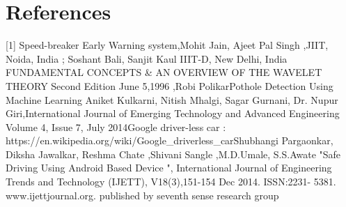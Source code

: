 \documentclass[12pt,twocolumn]{article}
\begin{document}
\section{References}
[1]	Speed-breaker Early Warning system,Mohit Jain, Ajeet Pal Singh ,JIIT, Noida, India ; 	Soshant Bali, Sanjit Kaul IIIT-D, New Delhi, India \newline
[2]	FUNDAMENTAL CONCEPTS \& AN OVERVIEW OF THE WAVELET THEORY 
	Second Edition June 5,1996 ,Robi Polikar\newline
[3]	Pothole Detection Using Machine Learning Aniket Kulkarni, 	Nitish Mhalgi, Sagar 	Gurnani, Dr. Nupur Giri,International 	Journal of Emerging Technology and Advanced 	Engineering Volume 4, Issue 7, July 2014\newline
[4]	Google driver-less car : https://en.wikipedia.org/wiki/Google\_driverless\_car\newline
[5]	Shubhangi Pargaonkar, Diksha Jawalkar, Reshma Chate ,Shivani Sangle ,M.D.Umale, 	S.S.Awate "Safe 	Driving Using Android Based Device ", International Journal of 	Engineering Trends and Technology (IJETT), 	V18(3),151-154 Dec 2014. ISSN:2231-	5381. www.ijettjournal.org. published by seventh sense research group \newline

\end{document}
